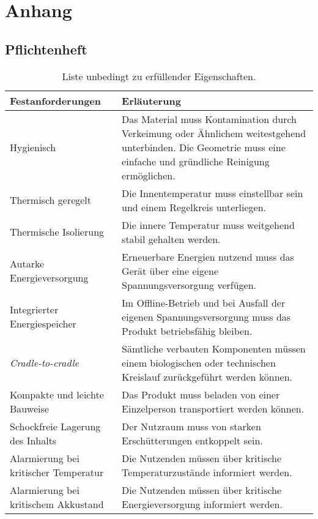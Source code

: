 \chapter{Anhang}
	\section{Pflichtenheft}
		\begin{table}[h]
			\centering
			\caption{Liste unbedingt zu erfüllender Eigenschaften.}
			\begin{tabular}{@{}p{.5\textwidth}p{}@{}}
				\toprule
				\textbf{Festanforderungen} 						& \textbf{Erläuterung} \\
				\midrule
				Hygienisch										& Das Material muss Kontamination durch Verkeimung
				oder Ähnlichem weitestgehend unterbinden. Die Geometrie muss eine einfache und gründliche Reinigung ermöglichen.\\
				Thermisch geregelt								& Die Innentemperatur muss einstellbar sein und einem Regelkreis unterliegen.\\
				Thermische Isolierung							& Die innere Temperatur muss weitgehend stabil gehalten werden. \\
				Autarke Energieversorgung						& Erneuerbare Energien nutzend muss das Gerät über eine eigene Spannungsversorgung verfügen.\\
				Integrierter Energiespeicher					& Im Offline-Betrieb und bei Ausfall der eigenen Spannungsversorgung muss das Produkt betriebsfähig bleiben.\\
				\textit{Cradle-to-cradle}						& Sämtliche verbauten Komponenten müssen einem biologischen oder technischen Kreislauf zurückgeführt werden können.\\
				Kompakte und leichte Bauweise 					& Das Produkt muss beladen von einer Einzelperson transportiert werden können.\\
				Schockfreie Lagerung des Inhalts 				& Der Nutzraum muss von starken Erschütterungen entkoppelt sein.\\
				Alarmierung bei kritischer Temperatur			& Die Nutzenden müssen über kritische Temperaturzustände informiert werden.\\
				Alarmierung bei kritischem Akkustand			& Die Nutzenden müssen über kritische Energieversorgung informiert werden.\\
				\bottomrule
			\end{tabular}
		\end{table}
